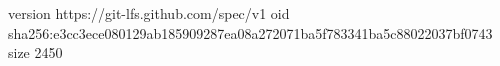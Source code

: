 version https://git-lfs.github.com/spec/v1
oid sha256:e3cc3ece080129ab185909287ea08a272071ba5f783341ba5c88022037bf0743
size 2450

